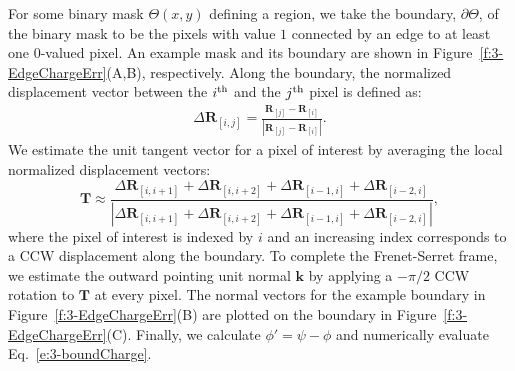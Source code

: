 For some binary mask $\Theta(x,y)$ defining a region, we take the boundary, $\partial \Theta$, of the binary mask to be the pixels with value $1$ connected by an edge to at least one $0$-valued pixel.
An example mask and its boundary are shown in Figure~\ref{f:3-EdgeChargeErr}(A,B), respectively.
Along the boundary, the normalized displacement vector between the $i^{\rm th}$ and the $j^{\rm th}$ pixel is defined as:
\begin{align}
  \Delta \mathbf{R}_{[i,j]} =  \frac{\mathbf{R}_{[j]}-\mathbf{R}_{[i]}}{|\mathbf{R}_{[j]}-\mathbf{R}_{[i]}|}.
\end{align}
We estimate the unit tangent vector for a pixel of interest by averaging the local normalized displacement vectors:
\begin{equation}
  \mathbf{T} \approx \frac{\Delta \mathbf{R}_{[i,i+1]} + \Delta \mathbf{R}_{[i,i+2]} + \Delta \mathbf{R}_{[i-1,i]} + \Delta \mathbf{R}_{[i-2,i]}}{|\Delta \mathbf{R}_{[i,i+1]} + \Delta \mathbf{R}_{[i,i+2]} + \Delta \mathbf{R}_{[i-1,i]} + \Delta \mathbf{R}_{[i-2,i]}|},
\end{equation}
where the pixel of interest is indexed by $i$ and an increasing index corresponds to a CCW displacement along the boundary.
To complete the Frenet-Serret frame, we estimate the outward pointing unit normal $\mathbf{k}$ by applying a $-\pi/2$ CCW rotation to $\mathbf{T}$ at every pixel.
The normal vectors for the example boundary in Figure~\ref{f:3-EdgeChargeErr}(B) are plotted on the boundary in Figure~\ref{f:3-EdgeChargeErr}(C).
Finally, we calculate $\phi' = \psi-\phi$ and numerically evaluate Eq.~\ref{e:3-boundCharge}.
